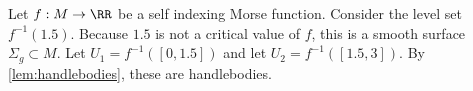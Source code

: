 

    Let $f: M\to \RR$ be a self indexing Morse function. Consider the level set $f^{-1}(1.5)$. Because $1.5$ is not a critical value of $f$, this is a smooth surface $\Sigma_g\subset M$. Let $U_1=f^{-1}([0, 1.5])$ and let $U_2=f^{-1}([1.5, 3])$. By \cref{lem:handlebodies}, these are handlebodies.
